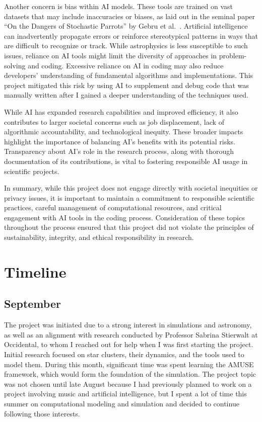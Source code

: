 \documentclass[10pt,twocolumn]{article}
\begin{document}
Another concern is bias within AI models. These tools are trained on vast datasets that may include inaccuracies or biases, as laid out in the seminal paper “On the Dangers of Stochastic Parrots” by Gebru et al.~\cite{gebru2021dangers}. Artificial intelligence can inadvertently propagate errors or reinforce stereotypical patterns in ways that are difficult to recognize or track. While astrophysics is less susceptible to such issues, reliance on AI tools might limit the diversity of approaches in problem-solving and coding. Excessive reliance on AI in coding may also reduce developers’ understanding of fundamental algorithms and implementations. This project mitigated this risk by using AI to supplement and debug code that was manually written after I gained a deeper understanding of the techniques used.

While AI has expanded research capabilities and improved efficiency, it also contributes to larger societal concerns such as job displacement, lack of algorithmic accountability, and technological inequity. These broader impacts highlight the importance of balancing AI’s benefits with its potential risks. Transparency about AI’s role in the research process, along with thorough documentation of its contributions, is vital to fostering responsible AI usage in scientific projects.

In summary, while this project does not engage directly with societal inequities or privacy issues, it is important to maintain a commitment to responsible scientific practices, careful management of computational resources, and critical engagement with AI tools in the coding process. Consideration of these topics throughout the process ensured that this project did not violate the principles of sustainability, integrity, and ethical responsibility in research.

\section{Timeline}

\subsection*{September}
The project was initiated due to a strong interest in simulations and astronomy, as well as an alignment with research conducted by Professor Sabrina Stierwalt at Occidental, to whom I reached out for help when I was first starting the project. Initial research focused on star clusters, their dynamics, and the tools used to model them. During this month, significant time was spent learning the AMUSE framework, which would form the foundation of the simulation. The project topic was not chosen until late August because I had previously planned to work on a project involving music and artificial intelligence, but I spent a lot of time this summer on computational modeling and simulation and decided to continue following those interests.
\end{document}

